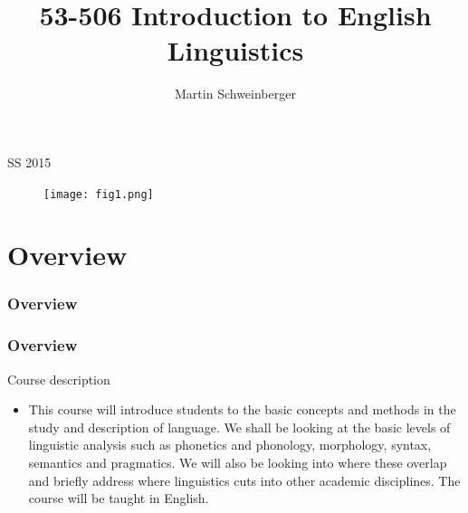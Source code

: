 \documentclass[12pt, table]{beamer}
\author{Martin Schweinberger}
\title{53-506 Introduction to English Linguistics}
\begin{document}
\begin{frame}[plain]
\titlepage
\begin{center}
SS 2015\\
\end{center}    
\begin{figure}[H]
\centering
\texttt{[image: fig1.png]} 
\label{fig:fig1}
\end{figure}
\end{frame}


\section{Overview}
\begin{frame}
\frametitle{Overview}
\begin{center}
\end{center}
\end{frame}

\begin{frame}
\frametitle{Overview}
Course description\\
\begin{itemize} 
\item This course will introduce students to the basic concepts and methods in the study and description of language. We shall be looking at the basic levels of linguistic analysis such as phonetics and phonology, morphology, syntax, semantics and pragmatics. We will also be looking into where these overlap and briefly address where linguistics cuts into other academic disciplines. The course will be taught in English.
\end{itemize}
\end{frame}
\end{document}
